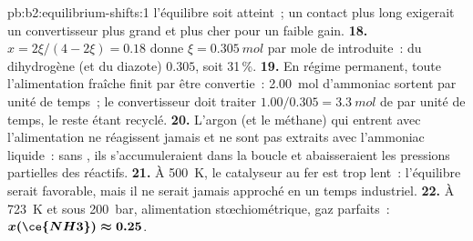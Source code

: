 \begin{solution}{pb:b2:equilibrium-shifts:1}
l'équilibre soit atteint~; un contact plus long exigerait un convertisseur plus grand et plus
cher pour un faible gain.
\textbf{18.} $x = 2\xi/(4 - 2\xi) = 0.18$ donne $\xi = \qty{0.305}{mol}$ par
mole de  introduite~:  du dihydrogène (et du diazote)
$0.305$, soit 31\,\%.
\textbf{19.} En régime permanent, toute l'alimentation fraîche finit par être convertie~:
\qty{2.00}{mol} d'ammoniac sortent par unité de temps~; le convertisseur doit traiter $1.00/
0.305 = \qty{3.3}{mol}$ de  par unité de temps, le reste étant recyclé.
\textbf{20.} L'argon (et le méthane) qui entrent avec l'alimentation ne réagissent jamais et
ne sont pas extraits avec l'ammoniac liquide~: sans , ils
s'accumuleraient dans la boucle et abaisseraient les pressions partielles des réactifs.
\textbf{21.} À \qty{500}{K}, le catalyseur au fer est trop lent~: l'équilibre
serait favorable, mais il ne serait jamais approché en un temps industriel.
\textbf{22.} À \qty{723}{K} et sous \qty{200}{bar}, alimentation stœchiométrique, gaz
parfaits~: $\boldsymbol{x(\ce{NH3}) \approx 0.25}$.
\end{solution}
